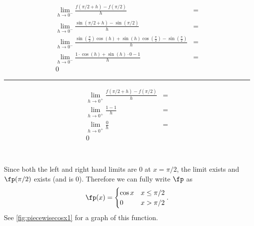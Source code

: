 {\small
\noindent\begin{minipage}{.59\linewidth}
\begin{align*}
\lim_{h\to0^-}\frac{f(\pi/2+h)-f(\pi/2)}{h} &=\\
\lim_{h\to0^-}\frac{\sin(\pi/2+h)-\sin(\pi/2)}{h}&=\\
\lim_{h\to0^-}{ \frac{\sin(\frac{\pi}{2})\cos(h)+\sin(h)\cos(\frac{\pi}{2})-\sin(\frac{\pi}{2})}{h}}&=\\
\lim_{h\to0^-}\frac{1\cdot\cos(h)+\sin(h)\cdot 0-1}{h} &=\\
0
\end{align*}
\end{minipage}
\begin{minipage}{1pt}
 \rule{.5pt}{100pt}
\end{minipage}
\begin{minipage}{.39\linewidth}
\begin{align*}
\lim_{h\to0^+}\frac{f(\pi/2+h)-f(\pi/2)}{h} &=\\
\lim_{h\to0^+}\frac{1-1}{h}&=\\
\lim_{h\to0^+}\frac{0}{h}&=\\
0&\\
\phantom{0}\\
\phantom{0}
\end{align*}
\end{minipage}
\normalsize


Since both the left and right hand limits are 0 at $x=\pi/2$, the limit exists and $\fp(\pi/2)$ exists (and is 0). Therefore we can fully write $\fp$ as
\[\fp(x) = \begin{cases}\cos x & x\leq\pi/2\\ 0 & x>\pi/2\end{cases}.\]
See \autoref{fig:piecewisecosx1} for a graph of this function.}

